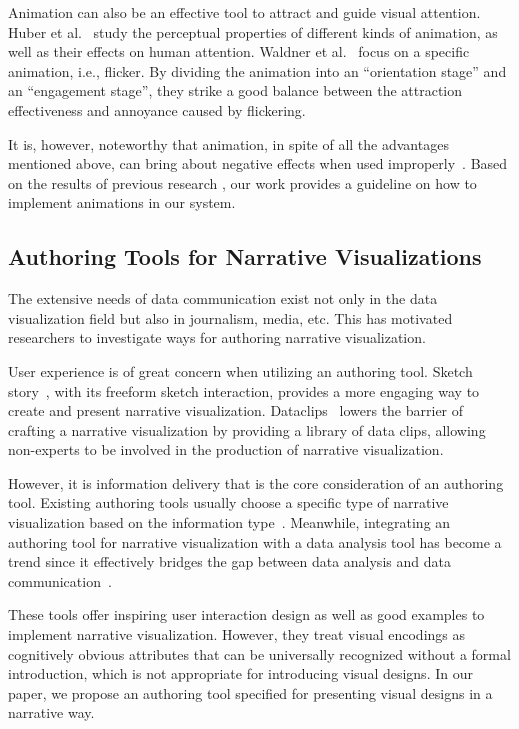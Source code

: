 Animation can also be an effective tool to attract and guide visual attention. Huber et al.~\cite{huber_visualizing_2005} study the perceptual properties of different kinds of animation, as well as their effects on human attention. Waldner et al.~\cite{waldner_attractive_2014} focus on a specific animation, i.e., flicker. By dividing the animation into an “orientation stage” and an “engagement stage”, they strike a good balance between the attraction effectiveness and annoyance caused by flickering. 

It is, however, noteworthy that animation, in spite of all the advantages mentioned above, can bring about negative effects when used improperly~\cite{robertson_effectiveness_2008}. Based on the results of previous research , our work provides a guideline on how to implement animations in our system.

\subsection{Authoring Tools for Narrative Visualizations}
The extensive needs of data communication exist not only in the data visualization field but also in journalism, media, etc. This has motivated researchers to investigate ways for authoring narrative visualization. 

User experience is of great concern when utilizing an authoring tool. Sketch story~\cite{lee_sketchstory:_2013}, with its freeform sketch interaction, provides a more engaging way to create and present narrative visualization. Dataclips~\cite{amini_authoring_2017} lowers the barrier of crafting a narrative visualization by providing a library of data clips, allowing non-experts to be involved in the production of narrative visualization. 

However, it is information delivery that is the core consideration of an authoring tool. Existing authoring tools usually choose a specific type of narrative visualization based on the information type~\cite{amini_authoring_2017, fulda_timelinecurator:_2016}. Meanwhile, integrating an authoring tool for narrative visualization with a  data analysis tool has become a trend since it effectively bridges the gap between data analysis and data communication~\cite{eccles_stories_2007, bryan_temporal_2016,lee_more_2015}. 
 
These tools offer inspiring user interaction design as well as good examples to implement narrative visualization. However, they treat visual encodings as cognitively obvious attributes that can be universally recognized without a formal introduction, which is not appropriate for introducing visual designs. In our paper, we propose an authoring tool specified for presenting visual designs in a narrative way. 

